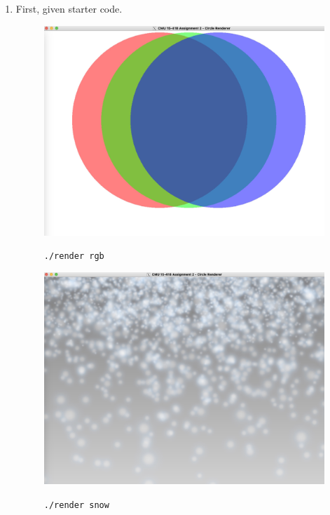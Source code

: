 \documentclass[letterpaper,11pt]{exam}
\begin{document}
\begin{questions}
    \begin{enumerate}[label=\roman*.]
        \item First, given starter code.
              \begin{figure}[h]
                  \begin{minipage}{0.45\textwidth}
                      \centering
                      \includegraphics[width=\textwidth]{img/render_rgb.jpg}
                      \label{fig:question3b}
                      \caption{\texttt{./render rgb}}
                  \end{minipage}
                  \hspace{1cm}
                  \begin{minipage}{0.45\textwidth}
                      \centering
                      \includegraphics[width=\textwidth]{img/render_snow.jpg}
                      \label{fig:question3b}
                      \caption{\texttt{./render snow}}
                  \end{minipage}
              \end{figure}


\end{enumerate}
\end{questions}
\end{document}
